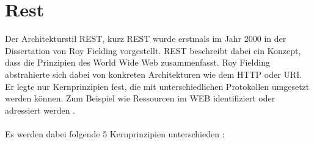 \chapter{Rest}
\label{sec:rest}
Der Architekturstil \acrlong{REST}, kurz \acrshort{REST} wurde erstmals im Jahr 2000 in der Dissertation von Roy Fielding vorgestellt. REST beschreibt dabei ein Konzept, dass die Prinzipien des World Wide Web zusammenfasst. Roy Fielding abstrahierte sich dabei von konkreten Architekturen wie dem \acrfull{HTTP} oder \acrfull{URI}. Er legte nur Kernprinzipien fest, die mit unterschiedlichen Protokollen umgesetzt werden können. Zum Beispiel wie Ressourcen im WEB identifiziert oder adressiert werden \cite{fielding:restDis}. \\
\\
Es werden dabei folgende 5 Kernprinzipien unterschieden \cite{restHttp:book}: 
